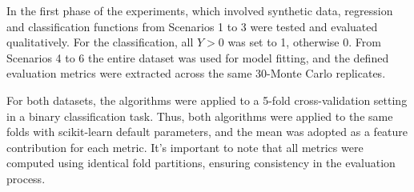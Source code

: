 In the first phase of the experiments, which involved synthetic data,  regression and classification functions from Scenarios 1 to 3 were tested and evaluated qualitatively. For the classification, all \(Y>0\) was set to 1, otherwise 0. From Scenarios 4 to 6 the entire dataset was used for model fitting, and the defined evaluation metrics were extracted across the same 30-Monte Carlo replicates. 

For both datasets, the algorithms were applied to a 5-fold cross-validation setting in a binary classification task. Thus, both algorithms were applied to the same folds with scikit-learn default parameters, and the mean was adopted as a feature contribution for each metric. It's important to note that all metrics were computed using identical fold partitions, ensuring consistency in the evaluation process.